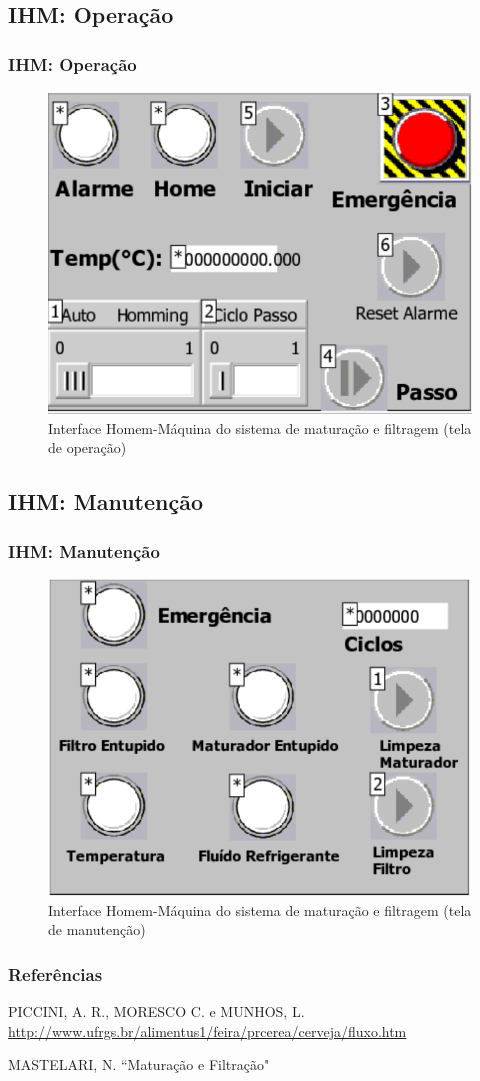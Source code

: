 \documentclass{beamer}
\begin{document}
\subsection{IHM: Operação}
\begin{frame}
	\frametitle{IHM: Operação}
	\begin{figure}[H]
		\centering
		\includegraphics [width=0.6\linewidth]{ihmsmall.pdf}
		\caption {Interface Homem-Máquina do sistema de maturação e filtragem (tela de operação)}
		\label{fig:ihm}
	\end{figure}
\end{frame}

\subsection{IHM: Manutenção}
\begin{frame}
	\frametitle{IHM: Manutenção}
	\begin{figure}[H]
		\centering
		\includegraphics [width=0.6\linewidth]{screen1small.pdf}
		\caption {Interface Homem-Máquina do sistema de maturação e filtragem (tela de manutenção)}
		\label{fig:screen1}
	\end{figure}
\end{frame}



\begin{frame}
\frametitle{Referências}
\footnotesize{
\begin{thebibliography}{99} %
	  PICCINI, A. R., MORESCO C. e MUNHOS, L. \url{http://www.ufrgs.br/alimentus1/feira/prcerea/cerveja/fluxo.htm}
	
	 MASTELARI, N. ``Maturação e Filtração"
\end{thebibliography}
}
\end{frame}


\end{document}
